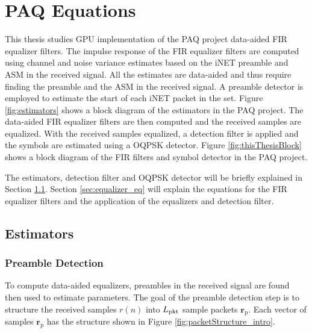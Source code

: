 

\chapter{PAQ Equations}
\label{chap:equations}

This thesis studies GPU implementation of the PAQ project data-aided FIR equalizer filters.
The impulse response of the FIR equalizer filters are computed using channel and noise variance estimates based on the iNET preamble and ASM in the received signal.
All the estimates are data-aided and thus require finding the preamble and the ASM in the received signal.
A preamble detector is employed to estimate the start of each iNET packet in the set.
Figure \ref{fig:estimators} shows a block diagram of the estimators in the PAQ project.
The data-aided FIR equalizer filters are then computed and the received samples are equalized.
With the received samples equalized, a detection filter is applied and the symbols are estimated using a OQPSK detector.
Figure \ref{fig:thisThesisBlock} shows a block diagram of the FIR filters and symbol detector in the PAQ project.

The estimators, detection filter and OQPSK detector will be briefly explained in Section \ref{sec:estimators}.
Section \ref{sec:equalizer_eq} will explain the equations for the FIR equalizer filters and the application of the equalizers and detection filter.

\section{Estimators}
\label{sec:estimators}
\subsection{Preamble Detection}
\label{sec:pd}
To compute data-aided equalizers, preambles in the received signal are found then used to estimate parameters.
The goal of the preamble detection step is to structure the received samples $r(n)$ into $L_\text{pkt}$ sample packets $\mathbf{r}_\text{p}$.
Each vector of samples $\mathbf{r}_\text{p}$ has the structure shown in Figure \ref{fig:packetStructure_intro}.

